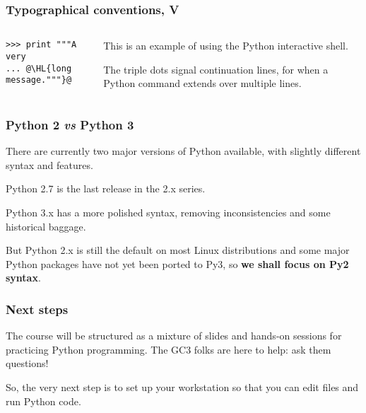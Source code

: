 \documentclass[english,serif,mathserif,xcolor=pdftex,dvipsnames,table]{beamer}
\begin{document}
\begin{frame}[fragile]
  \frametitle{Typographical conventions, V}

    \begin{columns}[t]
    \begin{column}{0.5\textwidth}
\begin{lstlisting}
>>> print """A very
... @\HL{long message."""}@
\end{lstlisting}
    \end{column}
    \begin{column}{0.5\textwidth}
      \raggedleft
      This is an example of using the Python interactive shell.

      \+
      The triple dots signal continuation lines,
      for when a Python command extends over multiple lines.
    \end{column}
  \end{columns}
\end{frame}


\begin{frame}
  \frametitle{Python 2 \emph{vs} Python 3}

  There are currently two major versions of Python available, with
  slightly different syntax and features.

  \+
  Python 2.7 is the last release in the 2.x series.

  \+
  Python 3.x has a more polished syntax, removing inconsistencies and
  some historical baggage.

  \+
  But Python 2.x is still the default on most Linux distributions
  and some major Python packages have not yet been ported to Py3, so
  \textbf{we shall focus on Py2 syntax}.
\end{frame}


\begin{frame}
  \frametitle{Next steps}

  The course will be structured as a mixture of slides and hands-on
  sessions for practicing Python programming.  The GC3 folks are here
  to help: ask them questions!

  \+
  So, the very next step is to set up your workstation so that you
  can edit files and run Python code.
\end{frame}
\end{document}
